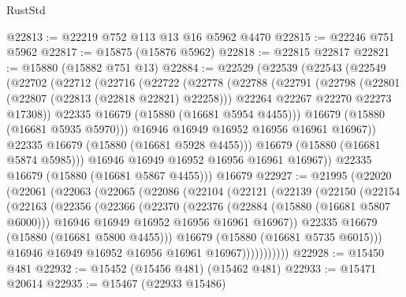 \begin{lexlean}{RustStd}
\begin{coremodule}
@22813 := @22219 @752 @113 @13 @16 @5962 @4470
@22815 := @22246 @751 @5962
@22817 := @15875 (@15876 @5962)
@22818 := @22815 @22817
@22821 := @15880 (@15882 @751 @13)
@22884 := @22529
    (@22539
      (@22543
        (@22549
          (@22702
            (@22712
              (@22716
                (@22722
                  (@22778
                    (@22788
                      (@22791
                        (@22798
                          (@22801 (@22807 (@22813 (@22818 @22821) @22258)))
                          @22264
                          @22267
                          @22270
                          @22273
                          @17308))
                      @22335
                      @16679
                      (@15880 (@16681 @5954 @4455)))
                    @16679
                    (@15880 (@16681 @5935 @5970)))
                  @16946
                  @16949
                  @16952
                  @16956
                  @16961
                  @16967))
              @22335
              @16679
              (@15880 (@16681 @5928 @4455)))
            @16679
            (@15880 (@16681 @5874 @5985)))
          @16946
          @16949
          @16952
          @16956
          @16961
          @16967))
      @22335
      @16679
      (@15880 (@16681 @5867 @4455)))
    @16679
@22927 := @21995
    (@22020
      (@22061
        (@22063
          (@22065
            (@22086
              (@22104
                (@22121
                  (@22139
                    (@22150
                      (@22154
                        (@22163
                          (@22356
                            (@22366
                              (@22370
                                (@22376
                                  (@22884 (@15880 (@16681 @5807 @6000)))
                                  @16946
                                  @16949
                                  @16952
                                  @16956
                                  @16961
                                  @16967))
                              @22335
                              @16679
                              (@15880 (@16681 @5800 @4455)))
                            @16679
                            (@15880 (@16681 @5735 @6015)))
                          @16946
                          @16949
                          @16952
                          @16956
                          @16961
                          @16967)))))))))))
@22928 := @15450 @481
@22932 := @15452 (@15456 @481) (@15462 @481)
@22933 := @15471 @20614
@22935 := @15467 (@22933 @15486)

\end{coremodule}
\end{lexlean}

